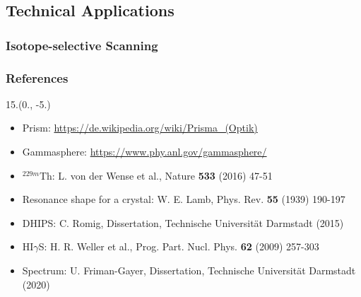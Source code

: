 \documentclass{beamer}
\begin{document}
\subsection{Technical Applications}

\begin{frame}
    \frametitle{Isotope-selective Scanning}
\end{frame}

\begin{frame}
    \frametitle{References}
    \begin{textblock}{15.}(0., -5.)
    \begin{itemize}
        \item Prism: \url{https://de.wikipedia.org/wiki/Prisma_(Optik)}
        \item Gammasphere: \url{https://www.phy.anl.gov/gammasphere/}
        \item $^{229m}$Th: L. von der Wense et al., Nature \textbf{533} (2016) 47-51
        \item Resonance shape for a crystal: W. E. Lamb, Phys. Rev. \textbf{55} (1939) 190-197
        \item DHIPS: C. Romig, Dissertation, Technische Universit\"at Darmstadt (2015)
        \item HI$\gamma$S: H. R. Weller et al., Prog. Part. Nucl. Phys. \textbf{62} (2009) 257-303
        \item Spectrum: U. Friman-Gayer, Dissertation, Technische Universit\"at Darmstadt (2020)
    \end{itemize}
    \end{textblock}
\end{frame}
\end{document}
